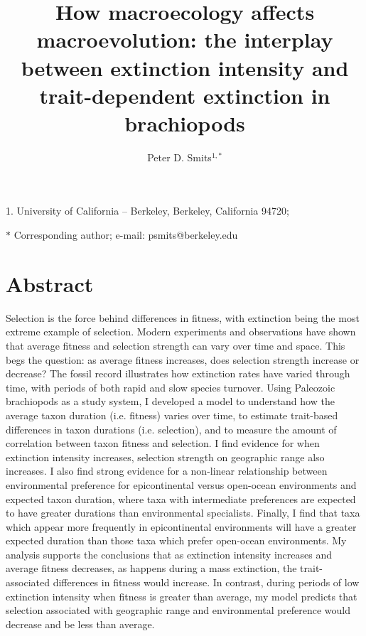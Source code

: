 \documentclass[11pt]{article}
\title{How macroecology affects macroevolution: the interplay between extinction intensity and trait-dependent extinction in brachiopods}
\author{Peter D. Smits$^{1,\ast}$}
\date{}
\begin{document}
\maketitle

\noindent{} 1. University of California -- Berkeley, Berkeley, California 94720;

\noindent{} $\ast$ Corresponding author; e-mail: psmits@berkeley.edu


\linenumbers{}
\modulolinenumbers[3]

\newpage{}

\section*{Abstract}

Selection is the force behind differences in fitness, with extinction being the most extreme example of selection. Modern experiments and observations have shown that average fitness and selection strength can vary over time and space. This begs the question: as average fitness increases, does selection strength increase or decrease? The fossil record illustrates how extinction rates have varied through time, with periods of both rapid and slow species turnover. Using Paleozoic brachiopods as a study system, I developed a model to understand how the average taxon duration (i.e. fitness) varies over time, to estimate trait-based differences in taxon durations (i.e. selection), and to measure the amount of correlation between taxon fitness and selection. I find evidence for when extinction intensity increases, selection strength on geographic range also increases. I also find strong evidence for a non-linear relationship between environmental preference for epicontinental versus open-ocean environments and expected taxon duration, where taxa with intermediate preferences are expected to have greater durations than environmental specialists. Finally, I find that taxa which appear more frequently in epicontinental environments will have a greater expected duration than those taxa which prefer open-ocean environments. My analysis supports the conclusions that as extinction intensity increases and average fitness decreases, as happens during a mass extinction, the trait-associated differences in fitness would increase. In contrast, during periods of low extinction intensity when fitness is greater than average, my model predicts that selection associated with geographic range and environmental preference would decrease and be less than average.
\end{document}
